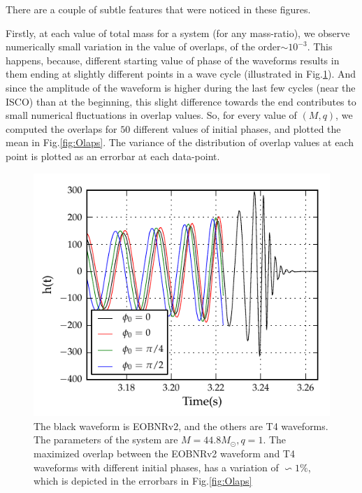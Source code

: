 \documentclass[aps,
prd,
amsmath,
amssymb,
twocolumn,
floatfix,
groupedaddress]{revtex4-1}
\begin{document}
There are a couple of subtle features that were noticed in these figures. 

Firstly, at each value of total mass for a system (for any mass-ratio), we observe numerically small variation in the value of overlaps, of the order$\sim 10^{-3}$. This happens, because, different starting value of phase of the waveforms results in them ending at slightly different points in a wave cycle (illustrated in Fig.\ref{fig:Olapphi0}). And since the amplitude of the waveform is higher during the last few cycles (near the ISCO) than at the beginning, this slight difference towards the end contributes to small numerical fluctuations in overlap values. So, for every value of $(M,q)$, we computed the overlaps for $50$ different values of initial phases, and plotted the mean in Fig.\ref{fig:Olaps}. The variance of the distribution of overlap values at each point is plotted as an errorbar at each data-point.

\begin{figure}
\centering
\includegraphics[scale=1.0, clip=false, totalheight=0.3\textheight, width=\columnwidth]{tdwaveform_phi0.pdf}
\caption{\label{fig:Olapphi0}The black waveform is EOBNRv2, and the others are T4 waveforms. The parameters of the system  are $M=44.8M_{\odot},q=1$. The maximized overlap between the EOBNRv2 waveform and T4 waveforms with different initial phases, has a variation of $\backsim1\%$, which is depicted in the errorbars in Fig.\ref{fig:Olaps}}
\end{figure}
\end{document}
